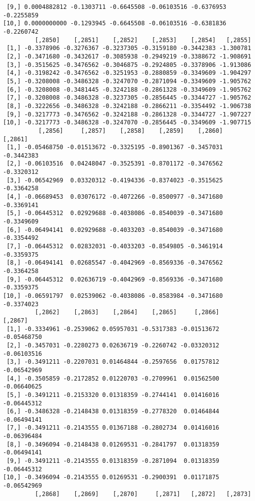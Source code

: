 \documentclass[
  letterpaper,
  DIV=11,
  numbers=noendperiod]{scrreprt}
\begin{document}
\begin{verbatim}
 [9,] 0.0004882812 -0.1303711 -0.6645508 -0.06103516 -0.6376953 -0.2255859
[10,] 0.0000000000 -0.1293945 -0.6645508 -0.06103516 -0.6381836 -0.2260742
         [,2850]    [,2851]    [,2852]    [,2853]    [,2854]   [,2855]
 [1,] -0.3378906 -0.3276367 -0.3237305 -0.3159180 -0.3442383 -1.300781
 [2,] -0.3471680 -0.3432617 -0.3085938 -0.2949219 -0.3388672 -1.908691
 [3,] -0.3515625 -0.3476562 -0.3046875 -0.2924805 -0.3378906 -1.913086
 [4,] -0.3198242 -0.3476562 -0.3251953 -0.2880859 -0.3349609 -1.904297
 [5,] -0.3208008 -0.3486328 -0.3247070 -0.2871094 -0.3349609 -1.905762
 [6,] -0.3208008 -0.3481445 -0.3242188 -0.2861328 -0.3349609 -1.905762
 [7,] -0.3208008 -0.3486328 -0.3237305 -0.2856445 -0.3344727 -1.905762
 [8,] -0.3222656 -0.3486328 -0.3242188 -0.2866211 -0.3354492 -1.906738
 [9,] -0.3217773 -0.3476562 -0.3242188 -0.2861328 -0.3344727 -1.907227
[10,] -0.3217773 -0.3486328 -0.3247070 -0.2856445 -0.3349609 -1.907715
          [,2856]     [,2857]    [,2858]    [,2859]    [,2860]    [,2861]
 [1,] -0.05468750 -0.01513672 -0.3325195 -0.8901367 -0.3457031 -0.3442383
 [2,] -0.06103516  0.04248047 -0.3525391 -0.8701172 -0.3476562 -0.3320312
 [3,] -0.06542969  0.03320312 -0.4194336 -0.8374023 -0.3515625 -0.3364258
 [4,] -0.06689453  0.03076172 -0.4072266 -0.8500977 -0.3471680 -0.3369141
 [5,] -0.06445312  0.02929688 -0.4038086 -0.8540039 -0.3471680 -0.3349609
 [6,] -0.06494141  0.02929688 -0.4033203 -0.8540039 -0.3471680 -0.3354492
 [7,] -0.06445312  0.02832031 -0.4033203 -0.8549805 -0.3461914 -0.3359375
 [8,] -0.06494141  0.02685547 -0.4042969 -0.8569336 -0.3476562 -0.3364258
 [9,] -0.06445312  0.02636719 -0.4042969 -0.8569336 -0.3471680 -0.3359375
[10,] -0.06591797  0.02539062 -0.4038086 -0.8583984 -0.3471680 -0.3374023
         [,2862]    [,2863]    [,2864]    [,2865]     [,2866]     [,2867]
 [1,] -0.3334961 -0.2539062 0.05957031 -0.5317383 -0.01513672 -0.05468750
 [2,] -0.3457031 -0.2280273 0.02636719 -0.2260742 -0.03320312 -0.06103516
 [3,] -0.3491211 -0.2207031 0.01464844 -0.2597656  0.01757812 -0.06542969
 [4,] -0.3505859 -0.2172852 0.01220703 -0.2709961  0.01562500 -0.06640625
 [5,] -0.3491211 -0.2153320 0.01318359 -0.2744141  0.01416016 -0.06445312
 [6,] -0.3486328 -0.2148438 0.01318359 -0.2778320  0.01464844 -0.06494141
 [7,] -0.3491211 -0.2143555 0.01367188 -0.2802734  0.01416016 -0.06396484
 [8,] -0.3496094 -0.2148438 0.01269531 -0.2841797  0.01318359 -0.06494141
 [9,] -0.3491211 -0.2143555 0.01318359 -0.2871094  0.01318359 -0.06445312
[10,] -0.3496094 -0.2143555 0.01269531 -0.2900391  0.01171875 -0.06542969
         [,2868]    [,2869]    [,2870]     [,2871]   [,2872]   [,2873]

\end{verbatim}
\end{document}
